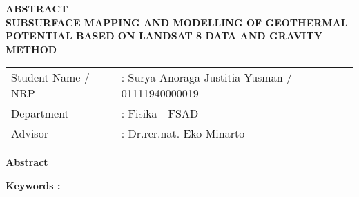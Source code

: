 \newpage

\begin{center}
	\textbf{ABSTRACT}\\
	\vskip 20pt
	\textbf{SUBSURFACE MAPPING AND MODELLING OF GEOTHERMAL POTENTIAL BASED ON LANDSAT 8 DATA AND GRAVITY METHOD}
	\vskip 20pt
\end{center}

\begin{table}[h]
	\begin{tabular}{ll}
		Student Name / NRP &: Surya Anoraga Justitia Yusman / 01111940000019\\
		Department &: Fisika - FSAD\\
		Advisor &: Dr.rer.nat. Eko Minarto
	\end{tabular}
\end{table}

\vskip 10pt
\textbf{Abstract}
\vskip 5pt
\hspace{25pt} 

\vskip 10pt
\textbf{Keywords :} 

\restoregeometry